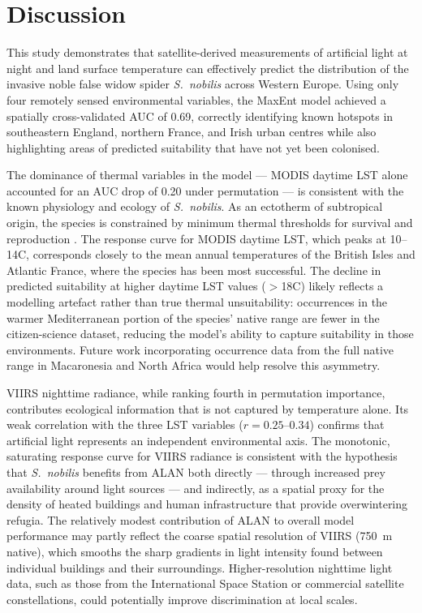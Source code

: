 \documentclass[11pt, a4paper, twocolumn]{article}
\begin{document}
\section{Discussion}

This study demonstrates that satellite-derived measurements of artificial light at night and land surface temperature can effectively predict the distribution of the invasive noble false widow spider \textit{S.~nobilis} across Western Europe. Using only four remotely sensed environmental variables, the MaxEnt model achieved a spatially cross-validated AUC of 0.69, correctly identifying known hotspots in southeastern England, northern France, and Irish urban centres while also highlighting areas of predicted suitability that have not yet been colonised.

The dominance of thermal variables in the model --- MODIS daytime LST alone accounted for an AUC drop of 0.20 under permutation --- is consistent with the known physiology and ecology of \textit{S.~nobilis}. As an ectotherm of subtropical origin, the species is constrained by minimum thermal thresholds for survival and reproduction \citep{Bauer2019}. The response curve for MODIS daytime LST, which peaks at 10--14\textdegree C, corresponds closely to the mean annual temperatures of the British Isles and Atlantic France, where the species has been most successful. The decline in predicted suitability at higher daytime LST values ($>$18\textdegree C) likely reflects a modelling artefact rather than true thermal unsuitability: occurrences in the warmer Mediterranean portion of the species' native range are fewer in the citizen-science dataset, reducing the model's ability to capture suitability in those environments. Future work incorporating occurrence data from the full native range in Macaronesia and North Africa would help resolve this asymmetry.

VIIRS nighttime radiance, while ranking fourth in permutation importance, contributes ecological information that is not captured by temperature alone. Its weak correlation with the three LST variables ($r = 0.25$--$0.34$) confirms that artificial light represents an independent environmental axis. The monotonic, saturating response curve for VIIRS radiance is consistent with the hypothesis that \textit{S.~nobilis} benefits from ALAN both directly --- through increased prey availability around light sources \citep{GastonBennie2014} --- and indirectly, as a spatial proxy for the density of heated buildings and human infrastructure that provide overwintering refugia. The relatively modest contribution of ALAN to overall model performance may partly reflect the coarse spatial resolution of VIIRS (750~m native), which smooths the sharp gradients in light intensity found between individual buildings and their surroundings. Higher-resolution nighttime light data, such as those from the International Space Station or commercial satellite constellations, could potentially improve discrimination at local scales.
\end{document}

